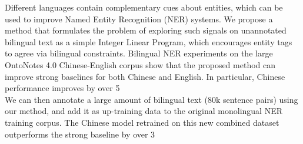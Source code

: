 Different languages contain complementary cues about entities, which can be used to improve Named Entity Recognition (NER) systems.
 We propose a method that formulates the problem of exploring such 
 signals on unannotated bilingual text as a simple Integer Linear Program, 
 which encourages entity tags to agree via bilingual constraints.
 Bilingual NER experiments on the large OntoNotes 4.0 Chinese-English corpus
 show 
 that the proposed method can improve strong baselines for both Chinese and
 English.
 In particular, Chinese performance improves by over 5\\%
 We can then annotate a large amount of bilingual text (80k sentence pairs)
 using our method, 
 and add it as up-training data to the original monolingual NER training corpus.
 The Chinese model retrained on this new combined dataset outperforms 
 the strong baseline by over 3\\%

